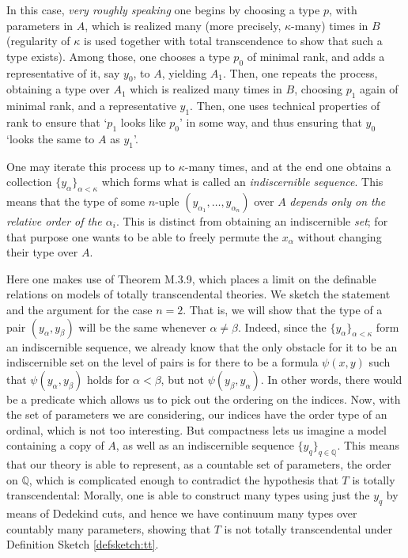 \documentclass{article}
\theoremstyle{nonumberplain}
\newcommand{\Q}{\mathbb{Q}}
\begin{document}
In this case, \emph{very roughly speaking} one begins by choosing a type $p$, with parameters in $A$, which is realized many (more precisely, $\kappa$-many) times in $B$ (regularity of $\kappa$ is used together with total transcendence to show that such a type exists). Among those, one chooses a type $p_0$ of minimal rank, and adds a representative of it, say $y_0$, to $A$, yielding $A_1$. Then, one repeats the process, obtaining a type over $A_1$ which is realized many times in $B$, choosing $p_1$ again of minimal rank, and a representative $y_1$. Then, one uses technical properties of rank to ensure that `$p_1$ looks like $p_0$' in some way, and thus ensuring that $y_0$ `looks the same to $A$ as $y_1$'.

One may iterate this process up to $\kappa$-many times, and at the end one obtains a collection $\{y_\alpha\}_{\alpha < \kappa}$ which forms what is called an \emph{indiscernible sequence}. This means that the type of some $n$-uple $(y_{\alpha_1}, \dots, y_{\alpha_n})$ over $A$ \emph{depends only on the relative order of the $\alpha_i$}. This is distinct from obtaining an indiscernible \emph{set}; for that purpose one wants to be able to freely permute the $x_\alpha$ without changing their type over $A$.

Here one makes use of Theorem M.3.9, which places a limit on the definable relations on models of totally transcendental theories. We sketch the statement and the argument for the case $n = 2$. That is, we will show that the type of a pair $(y_\alpha, y_\beta)$ will be the same whenever $\alpha \neq \beta$. Indeed, since the $\{y_\alpha\}_{\alpha < \kappa}$ form an indiscernible sequence, we already know that the only obstacle for it to be an indiscernible set on the level of pairs is for there to be a formula $\psi(x,y)$ such that $\psi(y_\alpha,y_\beta)$ holds for $\alpha < \beta$, but not $\psi(y_\beta, y_\alpha)$. In other words, there would be a predicate which allows us to pick out the ordering on the indices. Now, with the set of parameters we are considering, our indices have the order type of an ordinal, which is not too interesting. But compactness lets us imagine a model containing a copy of $A$, as well as an indiscernible sequence $\{y_q\}_{q \in \Q}$. This means that our theory is able to represent, as a countable set of parameters, the order on $\Q$, which is complicated enough to contradict the hypothesis that $T$ is totally transcendental: Morally, one is able to construct many types using just the $y_q$ by means of Dedekind cuts, and hence we have continuum many types over countably many parameters, showing that $T$ is not totally transcendental under Definition Sketch \ref{defsketch:tt}.
\end{document}
